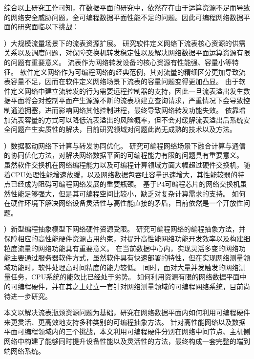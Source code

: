 \label{chap13}



\label{chap131}

综合以上研究工作可知，在数据平面的研究中，依然存在由于运算资源不足而导致的网络安全威胁问题，全可编程数据平面性能不足的问题。因此可编程网络数据平面的研究面临以下挑战：

{）大规模流量场景下的流表资源扩展。}
研究软件定义网络下流表核心资源的供需关系以及调度问题，对保障交换机转发稳定性以及解决网络数据平面运算资源有限的问题有重要意义。
流表作为网络转发设备的核心资源有性能强、容量小等特征。
软件定义网络作为可编程网络的经典范例，其对流量的精细区分更加导致流表容量不足，因而在软件定义网络场景下流表的容量问题变得更加凸显。
由于软件定义网络中建立流转发的行为需要远程控制器的支持，因此一旦流表溢出发生数据平面将会对控制平面产生源源不断的流表项建立查询请求，严重情况下会导致控制通道拥塞，进而影响网络其他控制进程，最终导致网络转发功能失效。
依靠增加流表容量的方式可以降低流表溢出的风险概率，但不会对缓解流表溢出后系统安全问题产生实质性的解决，目前研究领域对问题此尚无成熟的技术以及方法。

{）数据驱动网络下计算与转发协同优化。}
研究可编程网络场景下融合计算与通信的协同优化方法，对解决网络数据平面的可编程能力有限的问题具有重要意义。
虽然软件交换机在网络编程能力以及可编程计算领域方面大幅超过硬件交换机，随着CPU处理性能增速放缓，以及网络数据包吞吐容量迅速增大，其性能较弱的特点已经成为阻碍可编程网络发展的重要瓶颈。
基于P4可编程芯片的网络交换机虽然性能足够强大，但是其可编程空间比较小，缺乏对复杂计算需求的支持。
如何在硬件环境下解决网络设备灵活性与高性能直接的矛盾，目前依然是一个开放性问题。

{）新型编程抽象模型下网络硬件资源受限。}
研究可编程网络的编程抽象方法，并保障相应的高性能硬件资源占用约束，对提升高性能网络功能开发效率以及构建细粒度流量的网络功能具有重要意义。
在当前数据中心内，实现灵活多变的网络功能主要通过服务器软件方式，虽然软件具有快速部署的特性，但在实现网络测量领域功能时，软件处理高时间精度的能力较低。
同时，面对大量并发触发的网络测量任务，CPU系统的能效比已经处于劣势。
如何利用资源有限的网络数据平面中的可编程硬件，并在其之上建立一套针对网络测量领域的可编程网络系统，目前尚待进一步研究。

\label{chap132}
本文以解决流表瓶颈资源问题为基础，研究在网络数据平面内如何利用可编程硬件来更灵活、更高效地支持多种类别的可编程抽象方法。
针对高性能网络以及数据平面可编程领域内的三个挑战，本文利用可编程硬件分别在网络中间节点、主机侧网络中构建了能够同时提升设备性能以及灵活性的方法，最终构成一套完整的端到端网络系统。

